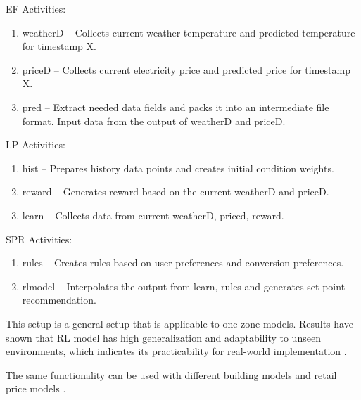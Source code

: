 EF Activities:

\begin{enumerate}
\item weatherD -- Collects current weather temperature and predicted temperature for timestamp X.
\item priceD -- Collects current electricity price and predicted price for timestamp X.
\item pred -- Extract needed data fields and packs it into an intermediate file format. Input data from the output of weatherD and priceD.
\end{enumerate}


LP Activities:

\begin{enumerate}
\item hist -- Prepares history data points and creates initial condition weights.
\item reward -- Generates reward based on the current weatherD and priceD.
\item learn -- Collects data from current weatherD, priced, reward.
\end{enumerate}

SPR Activities:

\begin{enumerate}
\item rules -- Creates rules based on user preferences and conversion preferences.
\item rlmodel --  Interpolates the output from learn, rules and generates set point recommendation.
\end{enumerate}

This setup is a general setup that is applicable to one-zone models. Results have shown that RL model has high generalization and adaptability to unseen environments, which indicates its practicability for real-world implementation \cite{du2021intelligent}.

The same functionality can be used with different building models and retail price models \cite{du2021intelligent}. 




